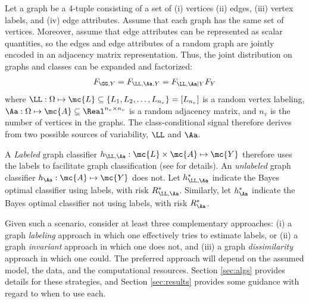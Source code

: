 \documentclass[10pt,journal,cspaper,compsoc]{IEEEtran}
\begin{document}
Let a graph be a 4-tuple consisting of a set of (i) vertices  (ii) edges, (iii) vertex labels, and (iv)  edge attributes. %
Assume that each graph has the same set of vertices.  Moreover, assume that edge attributes can be represented as scalar quantities, so the edges and edge attributes of a random graph are jointly encoded in an adjacency matrix representation.  Thus, the joint distribution on graphs and classes can be expanded and factorized:
\begin{align} \label{eq:gc}
	F_{\GG,Y}=F_{\LL,\Aa,Y}=F_{\LL,\Aa | Y} F_{Y}
\end{align}
where $\LL: \Omega \mapsto \mc{L} \subseteq \{L_1,L_2,\ldots,L_{n_v}\}=[L_{n_v}]$ is a random vertex labeling,  $\Aa: \Omega \mapsto \mc{A} \subseteq \Real^{n_v \times n_v}$ is a random adjacency matrix, and $n_v$ is the number of vertices in the graphs.  The class-conditional signal therefore derives from two possible sources of variability, $\LL$ and $\Aa$.  

A \emph{Labeled} graph classifier $h_{\LL,\Aa}: \mc{L}\times\mc{A} \mapsto \mc{Y}$ therefore uses the labels to facilitate graph classification (see \cite{Vogelstein2011} for details). An \emph{unlabeled} graph classifier $h_{\Aa}: \mc{A} \mapsto \mc{Y}$ does not.  Let $h^*_{\LL,\Aa}$ indicate the Bayes optimal classifier using labels, with risk $R^*_{\LL,\Aa}$.  Similarly, let $h^*_{\Aa}$ indicate the Bayes optimal classifier not using labels, with risk $R^*_{\Aa}$.  




Given such a scenario, consider at least three complementary approaches: (i) a graph \emph{labeling} approach in which one effectively tries to estimate labels, or (ii) a graph \emph{invariant} approach in which one does not, and (iii) a graph \emph{dissimilarity} approach in which one could.
The preferred approach will depend on the assumed model, the data, and the computational resources. Section \ref{sec:algs} provides details for these strategies, and Section \ref{sec:results} provides some guidance with regard to when to use each.
\end{document}
